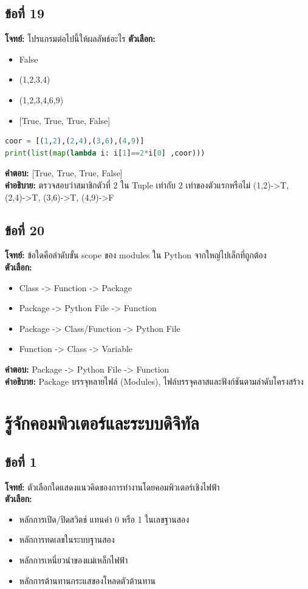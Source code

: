 \documentclass[12pt]{article}
\begin{document}
\subsection*{ข้อที่ 19}
\textbf{โจทย์:} โปรแกรมต่อไปนี้ให้ผลลัพธ์อะไร
\textbf{ตัวเลือก:}
\begin{itemize}
    \item False
    \item {(1,2,3,4)}
    \item {(1,2,3,4,6,9)}
    \item {[True, True, True, False]}
\end{itemize}
\begin{lstlisting}[language=Python]
coor = [(1,2),(2,4),(3,6),(4,9)]
print(list(map(lambda i: i[1]==2*i[0] ,coor)))
\end{lstlisting}
\textbf{คำตอบ:} [True, True, True, False]\\
\textbf{คำอธิบาย:} ตรวจสอบว่าสมาชิกตัวที่ 2 ใน Tuple เท่ากับ 2 เท่าของตัวแรกหรือไม่ (1,2)->T, (2,4)->T, (3,6)->T, (4,9)->F

\subsection*{ข้อที่ 20}
\textbf{โจทย์:} ข้อใดคือลำดับขั้น scope ของ modules ใน Python จากใหญ่ไปเล็กที่ถูกต้อง\\
\textbf{ตัวเลือก:}
\begin{itemize}
    \item Class -> Function -> Package
    \item Package -> Python File -> Function
    \item Package -> Class/Function -> Python File
    \item Function -> Class -> Variable
\end{itemize}

\textbf{คำตอบ:} Package -> Python File -> Function\\
\textbf{คำอธิบาย:} Package บรรจุหลายไฟล์ (Modules), ไฟล์บรรจุคลาสและฟังก์ชันตามลำดับโครงสร้าง

\newpage
\section{รู้จักคอมพิวเตอร์และระบบดิจิทัล}

\subsection*{ข้อที่ 1}
\textbf{โจทย์:} ตัวเลือกใดแสดงแนวคิดของการทำงานโดยคอมพิวเตอร์เชิงไฟฟ้า\\
\textbf{ตัวเลือก:}
\begin{itemize}
    \item หลักการเปิด/ปิดสวิตช์ แทนค่า 0 หรือ 1 ในเลขฐานสอง
    \item หลักการทดเลขในระบบฐานสอง
    \item หลักการเหนี่ยวนำของแม่เหล็กไฟฟ้า
    \item หลักการต้านทานกระแสของโหลดตัวต้านทาน
\end{itemize}
\end{document}
